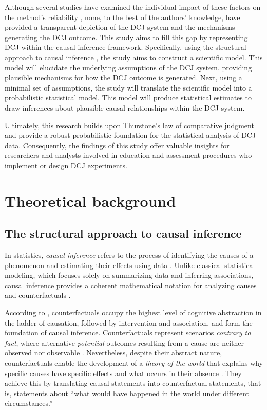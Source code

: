 \documentclass[
  authoryear,
  preprint,
  1p]{elsarticle}
\begin{document}
Although several studies have examined the individual impact of these
factors on the method's reliability
\citep{Bramley_2015, Pollitt_2012b, Bramley_et_al_2019, Verhavert_et_al_2019, Crompvoets_et_al_2022, vanDaal_et_al_2017, Gijsen_et_al_2021},
none, to the best of the authors' knowledge, have provided a transparent
depiction of the DCJ system and the mechanisms generating the DCJ
outcome. This study aims to fill this gap by representing DCJ within the
causal inference framework. Specifically, using the structural approach
to causal inference \citep{Wright_1921, Pearl_2009, Pearl_et_al_2016},
the study aims to construct a scientific model. This model will
elucidate the underlying assumptions of the DCJ system, providing
plausible mechanisms for how the DCJ outcome is generated. Next, using a
minimal set of assumptions, the study will translate the scientific
model into a probabilistic statistical model. This model will produce
statistical estimates to draw inferences about plausible causal
relationships within the DCJ system.

Ultimately, this research builds upon Thurstone's law of comparative
judgment \citeyearpar{Thurstone_1927} and provide a robust probabilistic
foundation for the statistical analysis of DCJ data. Consequently, the
findings of this study offer valuable insights for researchers and
analysts involved in education and assessment procedures who implement
or design DCJ experiments.

\section{Theoretical background}\label{sec-background}

\subsection{The structural approach to causal
inference}\label{sec-background-structural}

In statistics, \emph{causal inference} refers to the process of
identifying the causes of a phenomenon and estimating their effects
using data \citep{Shaughnessy_et_al_2010, Neal_2020}. Unlike classical
statistical modeling, which focuses solely on summarizing data and
inferring associations, causal inference provides a coherent
mathematical notation for analyzing causes and counterfactuals
\citep{Pearl_2009}.

According to \citet{Pearl_et_al_2018}, counterfactuals occupy the
highest level of cognitive abstraction in the ladder of causation,
followed by intervention and association, and form the foundation of
causal inference. Counterfactuals represent scenarios \emph{contrary to
fact}, where alternative \emph{potential} outcomes resulting from a
cause are neither observed nor observable
\citep{Neal_2020, Counterfactual_2024}. Nevertheless, despite their
abstract nature, counterfactuals enable the development of a
\emph{theory of the world} that explains why specific causes have
specific effects and what occurs in their absence
\citep{Pearl_et_al_2018}. They achieve this by translating causal
statements into counterfactual statements, that is, statements about
``what would have happened in the world under different circumstances.''
\end{document}
